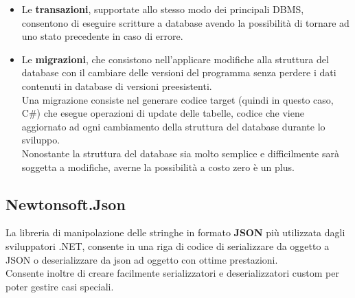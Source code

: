 \documentclass[\main/Tesi.tex]{subfiles}
\begin{document}
\begin{itemize}
    \item Le \textbf{transazioni}, supportate allo stesso modo dei principali DBMS, consentono di eseguire scritture a database avendo la possibilità di tornare ad uno stato precedente in caso di errore.
    \item Le \textbf{migrazioni}, che consistono nell'applicare modifiche alla struttura del database con il cambiare delle versioni del programma senza perdere i dati contenuti in database di versioni preesistenti.\\
    Una migrazione consiste nel generare codice target (quindi in questo caso, C\#) che esegue operazioni di update delle tabelle, codice che viene aggiornato ad ogni cambiamento della struttura del database durante lo sviluppo.\\
    Nonostante la struttura del database sia molto semplice e difficilmente sarà soggetta a modifiche, averne la possibilità a costo zero è un plus.
\end{itemize}

\subsection{Newtonsoft.Json}
La libreria di manipolazione delle stringhe in formato \textbf{JSON} \cite{json} più utilizzata dagli sviluppatori .NET, consente in una riga di codice di serializzare da oggetto a JSON o deserializzare da json ad oggetto con ottime prestazioni.\\
Consente inoltre di creare facilmente serializzatori e deserializzatori custom per poter gestire casi speciali.
\end{document}
